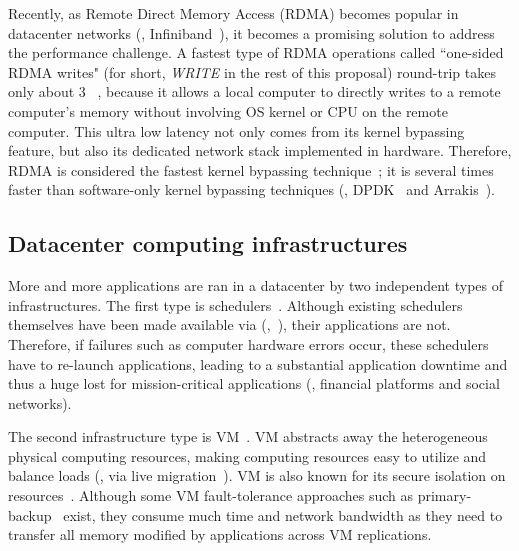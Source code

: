 Recently, as Remote Direct Memory Access (RDMA) becomes popular in datacenter 
networks (\eg, Infiniband~\cite{infiniband}), it becomes a promising solution 
to address the \paxos performance challenge. A fastest type of RDMA operations 
called ``one-sided RDMA writes" (for short, \emph{WRITE} in the rest of this 
proposal) round-trip takes only about 3 \us~\cite{pilaf:usenix14}, because it 
allows a local computer to directly writes to a remote computer's memory 
without involving OS kernel or CPU on the remote computer. This ultra low 
latency not only comes from its kernel bypassing feature, but also its 
dedicated network stack implemented in hardware. Therefore, RDMA is considered 
the fastest kernel bypassing 
technique~\cite{herd:sigcomm14,pilaf:usenix14,dare:hpdc15}; it is several times 
faster than software-only kernel bypassing techniques (\eg, 
DPDK~\cite{dpdk} and Arrakis~\cite{arrakis:osdi14}).

\vspace{-.15in}\subsection{Datacenter computing infrastructures}
\label{sec:datacenter}\vspace{-.075in}

More and more applications are ran in a datacenter by two 
independent types of infrastructures. The first type is 
schedulers~\cite{borg:eurosys15,mesos:nsdi11,tupperware, yarn:socc13, 
autopilot:sosp07,quincy:sosp09,apollo:osdi14,fuxi:vldb14}. Although existing 
schedulers themselves have been made available via \paxos 
(\eg,~\cite{mesos:nsdi11}), their applications are not. Therefore, if failures 
such as computer hardware errors occur, these schedulers have to re-launch 
applications, leading to a substantial application downtime and thus a 
huge lost for mission-critical applications (\eg, financial platforms and social 
networks).

The second infrastructure type is VM~\cite{amazon:vpc, openstack, esx:osdi02, 
kvm, xen:sosp}. VM abstracts away the heterogeneous physical computing 
resources, making computing resources easy to utilize and balance loads (\eg, 
via live migration~\cite{vmotion:atc05,xen:migration:nsdi05}). VM is also known 
for its secure isolation on resources~\cite{xen:sosp,kvm,vmware:sugerman}. 
Although some VM fault-tolerance approaches such 
as primary-backup~\cite{remus:nsdi08,ftvm} exist, they consume much 
time and network bandwidth as they need to transfer all memory modified by 
applications across VM replications.

